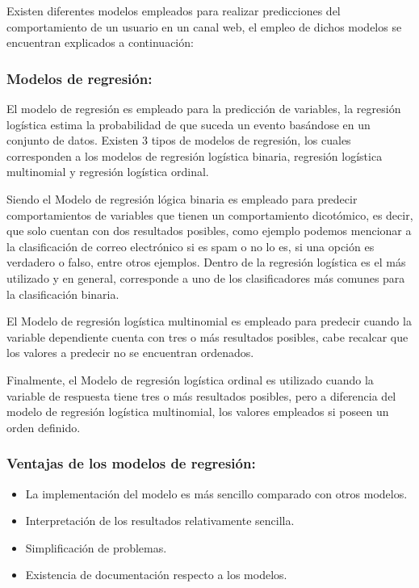 Existen diferentes modelos empleados para realizar predicciones del comportamiento de un usuario en un canal web, el empleo de dichos modelos se encuentran explicados a continuación:

\subsubsection{Modelos de regresión: }
El modelo de regresión es empleado para la predicción de variables, la regresión logística estima la probabilidad de que suceda un evento basándose en un conjunto de datos. Existen 3 tipos de modelos de regresión, los cuales corresponden a los modelos de regresión logística binaria, regresión logística multinomial y regresión logística ordinal.

Siendo el Modelo de regresión lógica binaria es empleado para predecir comportamientos de variables que tienen un comportamiento dicotómico, es decir, que solo cuentan con dos resultados posibles, como ejemplo podemos mencionar a la clasificación de correo electrónico si es spam o no lo es, si una opción es verdadero o falso, entre otros ejemplos. Dentro de la regresión logística es el más utilizado y en general, corresponde a uno de los clasificadores más comunes para la clasificación binaria.

El Modelo de regresión logística multinomial es empleado para predecir cuando la variable dependiente cuenta con tres o más resultados posibles, cabe recalcar que los valores a predecir no se encuentran ordenados.

Finalmente, el Modelo de regresión logística ordinal es utilizado cuando la variable de respuesta tiene tres o más resultados posibles, pero a diferencia del modelo de regresión logística multinomial, los valores empleados si poseen un orden definido.

\subsubsection{Ventajas de los modelos de regresión:}

\begin{itemize}
    \item La implementación del modelo es más sencillo comparado con otros modelos.
    \item Interpretación de los resultados relativamente sencilla.
    \item Simplificación de problemas.
    \item Existencia de documentación respecto a los modelos.
\end{itemize}

